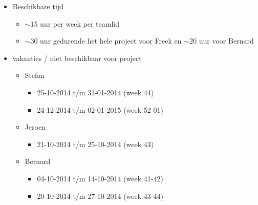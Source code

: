 \begin{itemize}
 \item Beschikbare tijd
 \begin{itemize}
  \item $\sim$15 uur per week per teamlid
  \item $\sim$30 uur gedurende het hele project voor Freek en $\sim$20 uur voor Bernard
 \end{itemize}



 \item vakanties / niet beschikbaar voor project
 \begin{itemize}

  \item Stefan
  \begin{itemize}
   \item 25-10-2014 t/m 31-01-2014 (week 44)
   \item 24-12-2014 t/m 02-01-2015 (week 52-01)
  \end{itemize}

  \item Jeroen
  \begin{itemize}
   \item 21-10-2014 t/m 25-10-2014 (week 43)
  \end{itemize}

  \item Bernard
   \begin{itemize}
    \item 04-10-2014 t/m 14-10-2014 (week 41-42)
    \item 20-10-2014 t/m 27-10-2014 (week 43-44)
   \end{itemize}

 \end{itemize}
\end{itemize}
